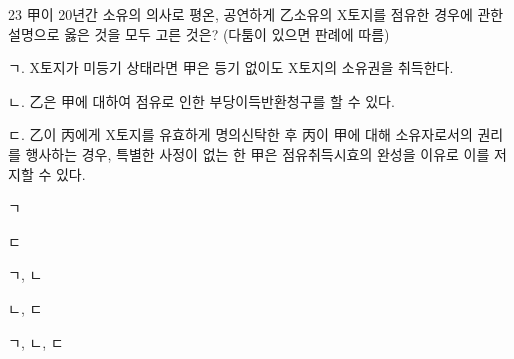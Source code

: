\begin{question}{23}
甲이 20년간 소유의 의사로 평온, 공연하게 乙소유의 X토지를 점유한 경우에 관한 설명으로 옳은 것을 모두 고른 것은? (다툼이 있으면 판례에 따름)
\begin{framedtext}
ㄱ. X토지가 미등기 상태라면 甲은 등기 없이도 X토지의 소유권을 취득한다. \par
ㄴ. 乙은 甲에 대하여 점유로 인한 부당이득반환청구를 할 수 있다. \par
ㄷ. 乙이 丙에게 X토지를 유효하게 명의신탁한 후 丙이 甲에 대해 소유자로서의 권리를 행사하는 경우, 특별한 사정이 없는 한 甲은 점유취득시효의 완성을 이유로 이를 저지할 수 있다.
\end{framedtext}
\begin{choices}
  \item ㄱ
  \item ㄷ
  \item ㄱ, ㄴ
  \item ㄴ, ㄷ
  \item ㄱ, ㄴ, ㄷ
\end{choices}
\end{question}
